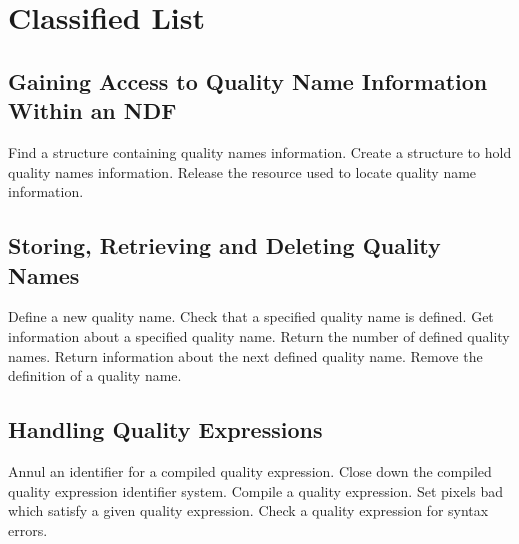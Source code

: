 \section {Classified List}

\subsection{Gaining Access to Quality Name Information Within an NDF}
   {Find a structure containing quality names information.}
   {Create a structure to hold quality names information.}
   {Release the resource used to locate quality name information.}

\subsection{Storing, Retrieving and Deleting Quality Names}
   {Define a new quality name.}
   {Check that a specified quality name is defined.}
   {Get information about a specified quality name.}
   {Return the number of defined quality names.}
   {Return information about the next defined quality name.}
   {Remove the definition of a quality name.}

\subsection{Handling Quality Expressions}
   {Annul an identifier for a compiled quality expression.}
   {Close down the compiled quality expression identifier system.}
   {Compile a quality expression.}
   {Set pixels bad which satisfy a given quality expression.}
   {Check a quality expression for syntax errors.}

